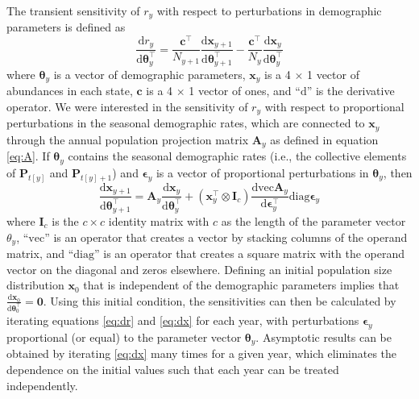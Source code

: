 \documentclass[11pt]{article}
\begin{document}
The transient sensitivity of $r_y$ with respect to perturbations in demographic parameters
is defined as
%
\begin{equation} \label{eq:dr}
\frac{\text{d}r_y}{\text{d}\boldsymbol\theta_y^\top} = 
    \frac{\mathbf{c}^\top}{N_{y+1}} \frac{\text{d}\mathbf{x}_{y+1}}
            {\text{d}\boldsymbol\theta_{y+1}^\top}-
        \frac{\mathbf{c}^\top}{N_{y}} \frac{\text{d}\mathbf{x}_y}
            {\text{d}\boldsymbol\theta_y^\top}
\end{equation}
%
where $\boldsymbol\theta_y$ is a vector of demographic parameters, 
$\mathbf{x}_y$ is a 4 $\times$ 1 vector of abundances in each state,
$\mathbf{c}$ is a 4 $\times$ 1 vector of ones,
and ``$\text{d}$'' is the derivative operator.
We were interested in the sensitivity of $r_y$ with respect to proportional 
perturbations in the seasonal demographic rates,
which are connected to $\mathbf{x}_y$ through the annual population projection matrix
$\mathbf{A}_y$ as defined in equation \ref{eq:A}.
If $\boldsymbol\theta_y$ contains the seasonal demographic rates 
(i.e., the collective elements of $\mathbf{P}_{t[y]}$ and $\mathbf{P}_{t[y]+1}$)
and $\boldsymbol\epsilon_y$ is a vector of proportional perturbations in
$\boldsymbol\theta_y$,
then 
%
\begin{equation} \label{eq:dx}
\frac{\text{d}\mathbf{x}_{y+1}}{\text{d}\boldsymbol\theta_{y+1}^\top} = 
    \mathbf{A}_y \frac{\text{d}\mathbf{x}_{y}}{\text{d}\boldsymbol\theta_y^\top}+
        \left(\mathbf{x}_{y}^\top \otimes \mathbf{I}_c \right)
            \frac{\text{dvec}\mathbf{A}_y}{\text{d}\boldsymbol\epsilon_y^\top}
                \text{diag}\boldsymbol\epsilon_y
\end{equation}
%
where $\mathbf{I}_c$ is the $c \times c$ identity matrix with $c$ as the length
of the parameter vector $\theta_y$,
``$\text{vec}$'' is an operator that creates a vector by stacking columns of the operand matrix,
and ``$\text{diag}$'' is an operator that creates a square matrix with the operand vector on
the diagonal and zeros elsewhere. 
Defining an initial population size distribution $\mathbf{x}_0$ 
that is independent of the demographic parameters implies that 
$\frac{\text{d}\mathbf{x}_0}{\text{d}\boldsymbol\theta_0^\top} = \mathbf{0}$.
Using this initial condition,
the sensitivities can then be calculated by iterating equations \ref{eq:dr} and \ref{eq:dx}
for each year, with perturbations $\boldsymbol\epsilon_y$ proportional (or equal)
to the parameter vector $\boldsymbol\theta_y$.
Asymptotic results can be obtained by iterating \ref{eq:dx} many times for a given year,
which eliminates the dependence on the initial values such that each year can be treated
independently. 
\end{document}
